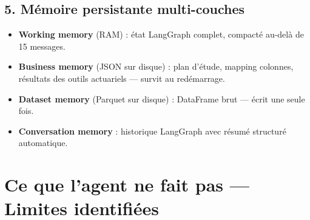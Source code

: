 \documentclass[12pt,a4paper]{article}
\begin{document}
\begin{capabilitybox}
\subsection*{5. Mémoire persistante multi-couches}
\begin{itemize}[leftmargin=1.5em]
  \item \textbf{Working memory} (RAM) : état LangGraph complet, compacté au-delà de 15 messages.
  \item \textbf{Business memory} (JSON sur disque) : plan d'étude, mapping colonnes, résultats
        des outils actuariels — survit au redémarrage.
  \item \textbf{Dataset memory} (Parquet sur disque) : DataFrame brut — écrit une seule fois.
  \item \textbf{Conversation memory} : historique LangGraph avec résumé structuré automatique.
\end{itemize}

\end{capabilitybox}

\newpage

\section{Ce que l'agent ne fait pas — Limites identifiées}
\end{document}
